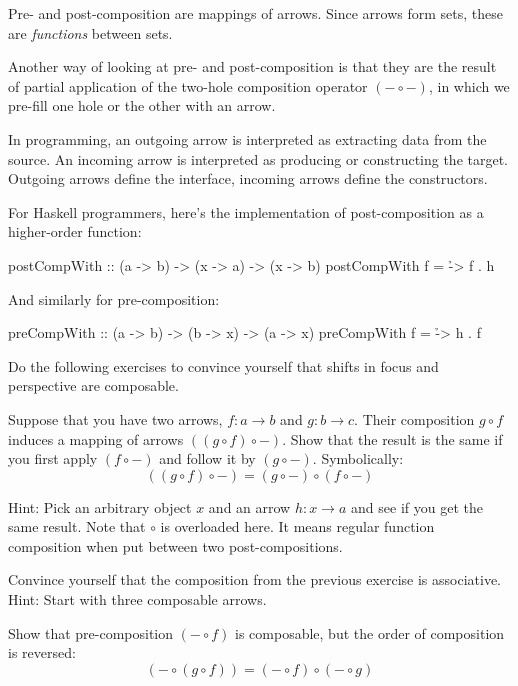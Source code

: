 \documentclass[DaoFP]{subfiles}
\begin{document}
Pre- and post-composition are mappings of arrows. Since arrows form sets, these are \emph{functions} between sets. 

Another way of looking at pre- and post-composition is that they are the result of partial application of the two-hole composition operator $(- \circ -)$, in which we pre-fill one hole or the other with an arrow.

In programming, an outgoing arrow is interpreted as extracting data from the source. An incoming arrow is interpreted as producing or constructing the target. Outgoing arrows define the interface, incoming arrows define the constructors.

For Haskell programmers, here's the implementation of post-composition as a higher-order function:
\begin{haskell}
postCompWith :: (a -> b) -> (x -> a) -> (x -> b)
postCompWith f = \h -> f . h
\end{haskell}
And similarly for pre-composition:
\begin{haskell}
preCompWith :: (a -> b) -> (b -> x) -> (a -> x)
preCompWith f = \h -> h . f
\end{haskell}

Do the following exercises to convince yourself that shifts in focus and perspective are composable.
\begin{exercise}\label{ex-yoneda-composition}
Suppose that you have two arrows, $f \colon a \to b$ and $g \colon b \to c$. Their composition $g \circ f$ induces a mapping of arrows $((g \circ f) \circ -)$. Show that the result is the same if you first apply $(f \circ -)$ and follow it by $(g \circ -)$. Symbolically:
\[((g \circ f) \circ -) = (g \circ -) \circ (f \circ -)\]

Hint: Pick an arbitrary object $x$ and an arrow $h \colon x \to a$ and see if you get the same result. Note that $\circ$ is overloaded here. It means regular function composition when put between two post-compositions.
\end{exercise}

\begin{exercise}
Convince yourself that the composition from the previous exercise is associative. Hint: Start with three composable arrows.
\end{exercise}

\begin{exercise}
Show that pre-composition $(- \circ f)$ is composable, but the order of composition is reversed:
\[(- \circ (g \circ f)) = (- \circ f) \circ (- \circ g) \]
\end{exercise}
\end{document}
